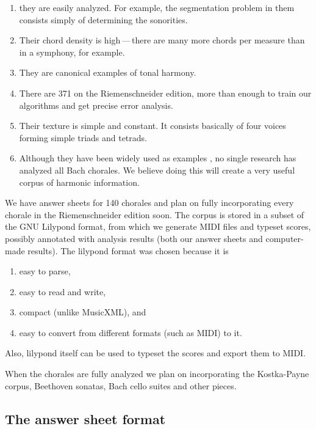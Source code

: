 \documentclass{article}
\begin{document}
\begin{enumerate}
\item they are easily analyzed. For example, the segmentation problem in
them consists simply of determining the sonorities.
\item Their chord density is high\,---\,there are many more chords per
  measure than in a symphony, for example.
\item They are canonical examples of tonal harmony.
\item There are 371 on the Riemenschneider edition, more than
  enough to train our algorithms and get precise error analysis.
\item Their texture is simple and constant. It consists basically of
  four voices forming simple triads and tetrads.
\item Although they have been widely used as examples
  \cite{taube:automatic, tsui:harmonic, illescas.ea:harmonic,
    winograd:linguistics}, no single research has analyzed all Bach
  chorales. We believe doing this will create a very useful corpus of
  harmonic information.
\end{enumerate}

We have answer sheets for 140 chorales and plan on fully incorporating
every chorale in the Riemenschneider \cite{bach:371} edition soon. The
corpus is stored in a subset of the GNU Lilypond format, from which we
generate MIDI files and typeset scores, possibly annotated with
analysis results (both our answer sheets and computer-made
results). The lilypond format was chosen because it is

\begin{enumerate}
\item easy to parse,
\item easy to read and write,
\item compact (unlike MusicXML), and
\item easy to convert from different formats (such as MIDI) to it.
\end{enumerate}

Also, lilypond itself can be used to typeset the scores and export
them to MIDI.

When the chorales are fully analyzed we plan on incorporating the
Kostka-Payne \cite{kostka.ea:tonal} corpus, Beethoven sonatas, Bach
cello suites and other pieces.

\subsection{The answer sheet format}
\label{sec:formato-dos-acordes}
\end{document}
